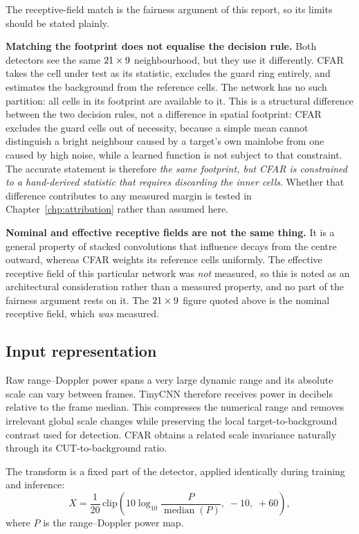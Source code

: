 The receptive-field match is the fairness argument of this report, so its limits should be stated
plainly.

\textbf{Matching the footprint does not equalise the decision rule.} Both detectors see the same
$21 \times 9$ neighbourhood, but they use it differently. CFAR takes the cell under test
as its statistic, excludes the guard ring entirely, and estimates the background from the
\CfarNRef{} reference cells. The network has no such partition: all \CfarWinCells{} cells in its
footprint are available to it. This is a structural difference between the two decision rules, not a
difference in spatial footprint: CFAR excludes the guard cells out of necessity, because a simple
mean cannot distinguish a bright neighbour caused by a target's own mainlobe from one caused by high
noise, while a learned function is not subject to that constraint. The accurate statement is
therefore \emph{the same footprint, but CFAR is constrained to a hand-derived statistic that requires
discarding the inner cells}. Whether that difference contributes to any measured margin is tested in
Chapter~\ref{chp:attribution} rather than assumed here.

\textbf{Nominal and effective receptive fields are not the same thing.} It is a general property of
stacked convolutions that influence decays from the centre outward, whereas CFAR weights its
reference cells uniformly. The effective receptive field of this particular network was \emph{not}
measured, so this is noted as an architectural consideration rather than a measured property, and no
part of the fairness argument rests on it. The $21 \times 9$ figure quoted above is the
nominal receptive field, which \emph{was} measured.

\subsection{Input representation}
\label{sec:inputrep}

Raw range--Doppler power spans a very large dynamic range and its absolute scale can vary between
frames. TinyCNN therefore receives power in decibels relative to the frame median. This compresses
the numerical range and removes irrelevant global scale changes while preserving the local
target-to-background contrast used for detection. CFAR obtains a related scale invariance naturally
through its CUT-to-background ratio.

The transform is a fixed part of the detector, applied identically during training and inference:
\begin{equation}
X = \frac{1}{20}\,\mathrm{clip}\!\left(10 \log_{10}
\frac{P}{\operatorname{median}(P)},\; -10,\; +60\right),
\label{eq:norm}
\end{equation}
where $P$ is the range--Doppler power map.

